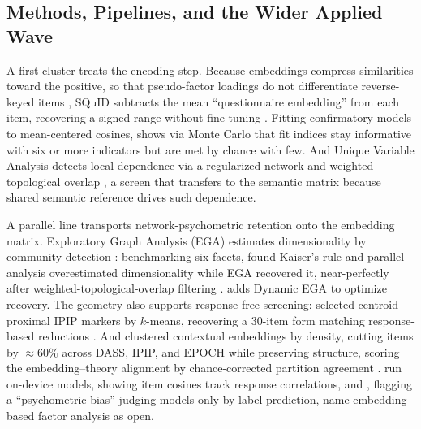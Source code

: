 \subsection{Methods, Pipelines, and the Wider Applied Wave}

A first cluster treats the encoding step. Because embeddings compress similarities
toward the positive, so that pseudo-factor loadings do not differentiate
reverse-keyed items \citep{suarez-alvarez-etal-2026}, SQuID subtracts the mean
``questionnaire embedding'' from each item, recovering a signed range without
fine-tuning \citep{pellert-etal-2026}. Fitting confirmatory
models to mean-centered cosines, \citet{pokropek-2026} shows via Monte Carlo that
fit indices stay informative with six or more indicators but are met by chance with
few. And Unique Variable Analysis detects local dependence via a regularized network
and weighted topological overlap \citep{christensen-etal-2023}, a screen that
transfers to the semantic matrix because shared semantic reference drives such
dependence.

A parallel line transports network-psychometric retention onto the embedding matrix.
Exploratory Graph Analysis (EGA) estimates dimensionality by community detection
\citep{golino-2026, garrido-etal-2025}: benchmarking six facets,
\citet{garrido-etal-2025} found Kaiser's rule \citep{kaiser-1960} and parallel
analysis \citep{horn-1965} overestimated dimensionality while EGA recovered it,
near-perfectly after weighted-topological-overlap filtering
\citep{christensen-etal-2023}. \citet{golino-2026} adds Dynamic EGA to optimize
recovery.
The geometry also supports response-free screening: \citet{jung-seo-2025}
selected centroid-proximal IPIP markers by $k$-means, recovering a 30-item form
matching response-based reductions \citep{openpsychometrics-2018}. And
\citet{wang-etal-2026} clustered contextual embeddings by density, cutting items by
$\approx60\%$ across DASS, IPIP, and EPOCH while preserving structure, scoring the
embedding--theory alignment by chance-corrected partition agreement
\citep{hubert-arabie-1985}. \citet{hussain-etal-2024} run on-device models,
showing item cosines track response correlations, and \citet{low-etal-preprint},
flagging a ``psychometric bias'' judging models only by label prediction, name
embedding-based factor analysis as open.

